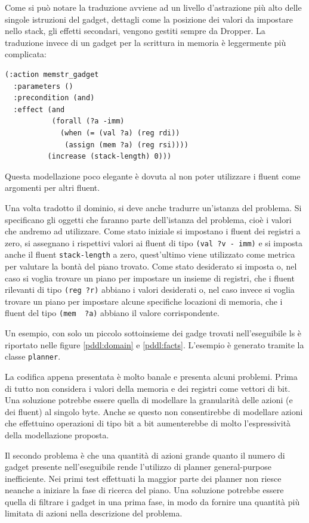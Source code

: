 Come si può notare la traduzione avviene ad un livello d'astrazione
più alto delle singole istruzioni del gadget, dettagli come la
posizione dei valori da impostare nello stack, gli effetti secondari,
vengono gestiti sempre da Dropper. La traduzione invece di un gadget
per la scrittura in memoria è leggermente più complicata:

\begin{lstlisting}
(:action memstr_gadget
  :parameters ()
  :precondition (and)
  :effect (and 
           (forall (?a -imm) 
             (when (= (val ?a) (reg rdi))
              (assign (mem ?a) (reg rsi))))
          (increase (stack-length) 0)))
\end{lstlisting}

Questa modellazione poco elegante è dovuta al non poter utilizzare i
fluent come argomenti per altri fluent.

Una volta tradotto il dominio, si deve anche tradurre un'istanza del
problema. Si specificano gli oggetti che faranno parte dell'istanza
del problema, cioè i valori che andremo ad utilizzare. Come stato
iniziale si impostano i fluent dei registri a zero, si assegnano i
rispettivi valori ai fluent di tipo \lstinline{(val ?v - imm)} e si
imposta anche il fluent \lstinline{stack-length} a zero, quest'ultimo
viene utilizzato come metrica per valutare la bontà del piano
trovato. Come stato desiderato si imposta o, nel caso si voglia
trovare un piano per impostare un insieme di registri, che i fluent
rilevanti di tipo \lstinline{(reg ?r)} abbiano i valori desiderati o,
nel caso invece si voglia trovare un piano per impostare alcune
specifiche locazioni di memoria, che i fluent del tipo \lstinline{(mem  ?a)}
 abbiano il valore corrispondente.

Un esempio, con solo un piccolo sottoinsieme dei gadge trovati
nell'eseguibile ls è riportato nelle figure \ref{pddl:domain} e
\ref{pddl:facts}. L'esempio è generato tramite la classe
\lstinline{planner}.

La codifica appena presentata è molto banale e presenta alcuni
problemi. Prima di tutto non considera i valori della memoria e dei
registri come vettori di bit. Una soluzione potrebbe essere quella di
modellare la granularità delle azioni (e dei fluent) al singolo
byte. Anche se questo non consentirebbe di modellare azioni che
effettuino operazioni di tipo bit a bit aumenterebbe di molto
l'espressività della modellazione proposta. 

Il secondo problema è che una quantità di azioni grande quanto il
numero di gadget presente nell'eseguibile rende l'utilizzo di planner
general-purpose inefficiente. Nei primi test effettuati la maggior
parte dei planner non riesce neanche a iniziare la fase di ricerca del
piano. Una soluzione potrebbe essere quella di filtrare i gadget in
una prima fase, in modo da fornire una quantità più limitata di azioni
nella descrizione del problema.


